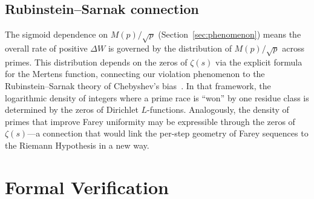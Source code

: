 \documentclass[11pt]{article}
\theoremstyle{definition}
\begin{document}
\subsection{Rubinstein--Sarnak connection}

The sigmoid dependence on $M(p)/\sqrt{p}$ (Section~\ref{sec:phenomenon})
means the overall rate of positive $\Delta W$ is governed by the distribution
of $M(p)/\sqrt{p}$ across primes.  This distribution depends on
the zeros of $\zeta(s)$ via the explicit formula for the Mertens
function, connecting our violation phenomenon to the
Rubinstein--Sarnak theory of Chebyshev's
bias~\cite{RubinsteinSarnak1994}.  In that framework, the
logarithmic density of integers where a prime race is ``won'' by
one residue class is determined by the zeros of Dirichlet
$L$-functions.  Analogously, the density of primes that
improve Farey uniformity may be expressible through the zeros
of~$\zeta(s)$---a connection that would link the per-step
geometry of Farey sequences to the Riemann Hypothesis in a
new way.





\section{Formal Verification}\label{sec:formal}
\end{document}
